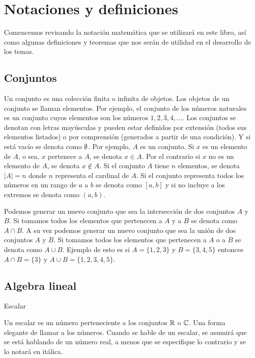 \section{Notaciones y definiciones}

Comencemos revisando la notación matemática que se utilizará en este libro, así como algunas definiciones y teoremas que nos serán de utilidad en el desarrollo de los temas.

\subsection*{Conjuntos}
Un conjunto es una colección finita o infinita de objetos. Los objetos de un conjunto se llaman elementos. 
Por ejemplo, el conjunto de los números naturales es un conjunto cuyos elementos son los números $1, 2, 3, 4, \ldots$.
Los conjuntos se denotan con letras mayúsculas y pueden estar definidos por extensión (todos sus elementos listados) o por comprensión (generados a partir de una condición). Y si está vacío se denota como $\emptyset$. 
Por ejemplo, $A$ es un conjunto.
Si $x$ es un elemento de $A$, o sea, $x$ pertenece a $A$, se denota $x \in A$. 
Por el contrario si $x$ no es un elemento de $A$, se denota $x \notin A$.
Si el conjunto $A$ tiene $n$ elementos, se denota $|A| = n$ donde $n$ representa el cardinal de $A$.
Si el conjunto representa todos los números en un rango de $a$ a $b$ se denota como $[a, b]$ y si no incluye a los extremos se denota como $(a, b)$.

Podemos generar un nuevo conjunto que sea la intersección de dos conjuntos $A$ y $B$. Si tomamos todos los elementos que pertenecen a $A$ y a $B$ se denota como $A \cap B$.
A su vez podemos generar un nuevo conjunto que sea la unión de dos conjuntos $A$ y $B$. Si tomamos todos los elementos que pertenecen a $A$ o a $B$ se denota como $A \cup B$.
Ejemplo de esto es si $A = \{1, 2, 3\}$ y $B = \{3, 4, 5\}$ entonces $A \cap B = \{3\}$ y $A \cup B = \{1, 2, 3, 4, 5\}$.

\subsection*{Algebra lineal}

\begin{definition}
    Escalar 

    Un escalar es un número perteneciente a los conjuntos $\mathbb{R}$  o $\mathbb{C}$. Una forma elegante
    de llamar a los números.
    Cuando se hable de un escalar, se asumirá que se está hablando de un número real, a menos que se 
    especifique lo contrario y se lo notará en itálica.
\end{definition}

